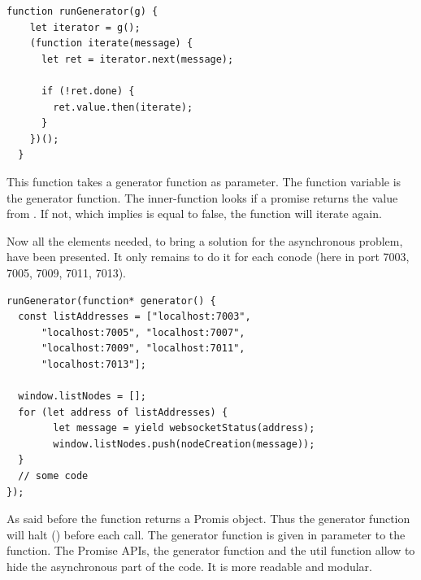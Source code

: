 \documentclass[11pt, a4paper, twoside, openright, openany]{article}
\begin{document}
\begin{lstlisting}[caption={Extract from the project's code~\cite{runGenerator}}, captionpos=b]
  function runGenerator(g) {
    let iterator = g();
    (function iterate(message) {
      let ret = iterator.next(message);

      if (!ret.done) {
        ret.value.then(iterate);
      }
    })();
  }
\end{lstlisting}

This function takes a generator function as parameter. The  function
variable is the generator function. The inner-function  looks if
a promise returns the value  from .
If not, which implies  is equal to false, the function will iterate again.

Now all the elements needed, to bring a solution for the asynchronous problem, have
been presented. It only remains to do it for each conode (here in port 7003, 7005, 7009, 7011, 7013).
\clearpage

\begin{lstlisting}[caption={Extract from the project's code reaching some conodes}, captionpos=b]
runGenerator(function* generator() {
  const listAddresses = ["localhost:7003",
      "localhost:7005", "localhost:7007",
      "localhost:7009", "localhost:7011",
      "localhost:7013"];

  window.listNodes = [];
  for (let address of listAddresses) {
        let message = yield websocketStatus(address);
        window.listNodes.push(nodeCreation(message));
  }
  // some code
});
\end{lstlisting}

As said before the  function returns a Promis object.
Thus the generator function  will halt () before each
 call.
\newline
The generator function is given in parameter to the  function.
\newline
The Promise APIs, the generator function and the util function  allow
to hide the asynchronous part of the code. It is more readable and modular.
\bigbreak
\end{document}
